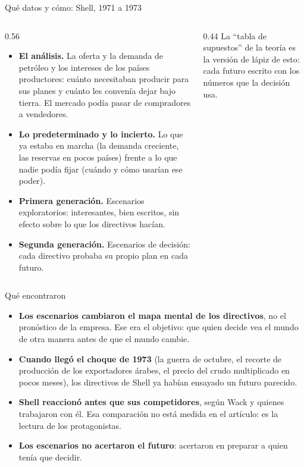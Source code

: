 \documentclass{beamer}
\begin{document}
\begin{frame}{Qué datos y cómo: Shell, 1971 a 1973}
\footnotesize
\begin{columns}[T]
\begin{column}{0.56\textwidth}
\begin{itemize}\itemsep3pt
  \item \textbf{El análisis.} La oferta y la demanda de petróleo y los intereses de los países productores: cuánto necesitaban producir para sus planes y cuánto les convenía dejar bajo tierra. El mercado podía pasar de compradores a vendedores.
  \item \textbf{Lo predeterminado y lo incierto.} Lo que ya estaba en marcha (la demanda creciente, las reservas en pocos países) frente a lo que nadie podía fijar (cuándo y cómo usarían ese poder).
  \item \textbf{Primera generación.} Escenarios exploratorios: interesantes, bien escritos, sin efecto sobre lo que los directivos hacían.
  \item \textbf{Segunda generación.} Escenarios de decisión: cada directivo probaba su propio plan en cada futuro.
\end{itemize}
\end{column}
\begin{column}{0.44\textwidth}
\smallskip
La ``tabla de supuestos'' de la teoría es la versión de lápiz de esto: cada futuro escrito con los números que la decisión usa.
\end{column}
\end{columns}
\end{frame}

\begin{frame}{Qué encontraron}
\footnotesize
\begin{itemize}\itemsep4pt
  \item \textbf{Los escenarios cambiaron el mapa mental de los directivos}, no el pronóstico de la empresa. Ese era el objetivo: que quien decide vea el mundo de otra manera antes de que el mundo cambie.
  \item \textbf{Cuando llegó el choque de 1973} (la guerra de octubre, el recorte de producción de los exportadores árabes, el precio del crudo multiplicado en pocos meses), los directivos de Shell ya habían ensayado un futuro parecido.
  \item \textbf{Shell reaccionó antes que sus competidores}, según Wack y quienes trabajaron con él. Esa comparación no está medida en el artículo: es la lectura de los protagonistas.
  \item \textbf{Los escenarios no acertaron el futuro}: acertaron en preparar a quien tenía que decidir.
\end{itemize}
\smallskip
{}
\end{frame}
\end{document}
